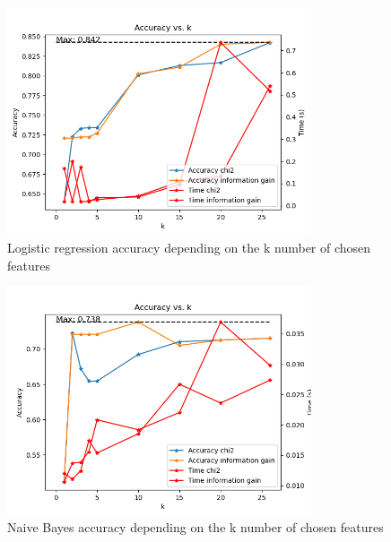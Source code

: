 \documentclass{article}
\begin{document}
    \begin{figure}[H]
        \centering
        \includegraphics[width=0.8\textwidth]{report_img/k_search/logistic_regression}
        \caption{Logistic regression accuracy depending on the k number of chosen features}
        \label{fig:}
    \end{figure}

    \begin{figure}[H]
        \centering
        \includegraphics[width=0.8\textwidth]{report_img/k_search/naive_bayes}
        \caption{Naive Bayes accuracy depending on the k number of chosen features}
        \label{fig:}
    \end{figure}
\end{document}
